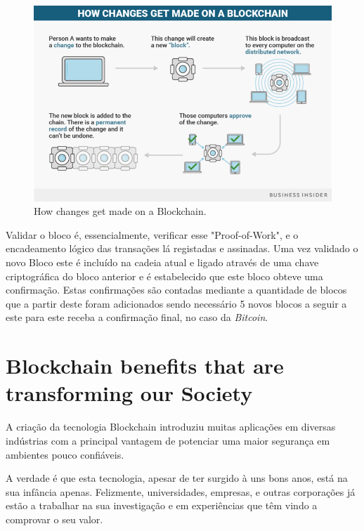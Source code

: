 \documentclass{llncs}
\begin{document}
	\begin{figure}
    \includegraphics[scale=0.4, center]{template_LNCS_Blockchain/img/blockchain-howitworks.png}
    \caption{How changes get made on a Blockchain.} \label{fig1}
    
    \end{figure}
    \vspace{5cm}

	Validar o bloco é, essencialmente, verificar esse "Proof-of-Work", e o encadeamento lógico das transações lá registadas e assinadas. Uma vez validado o novo Bloco este é incluído na cadeia atual e ligado através de uma chave criptográfica do bloco anterior e é estabelecido que este bloco obteve uma confirmação. Estas confirmações são contadas mediante a quantidade de blocos que a partir deste foram adicionados sendo necessário 5 novos blocos a seguir a este para este receba a confirmação final, no caso da \textit{Bitcoin}.
	

\section{Blockchain benefits that are transforming our Society}

A criação da tecnologia Blockchain introduziu muitas aplicações em diversas indústrias com a principal vantagem de potenciar uma maior segurança em ambientes pouco confiáveis. 
	
A verdade é que esta tecnologia, apesar de ter surgido à uns bons anos, está na sua infância apenas. Felizmente, universidades, empresas, e outras corporações já estão a trabalhar na sua investigação e em experiências que têm vindo a comprovar o seu valor.
\end{document}

